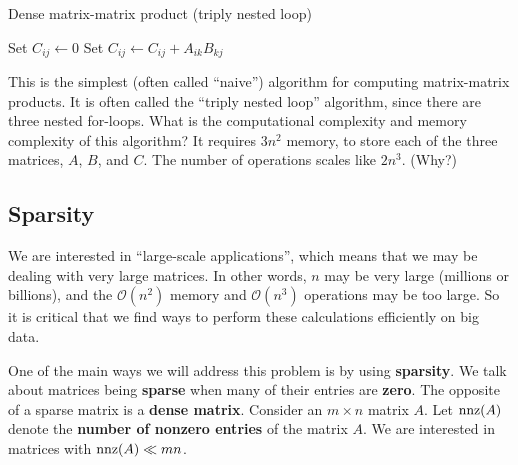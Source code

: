 \documentclass{lecture}
\begin{document}
\begin{algorithm}[H]
   \caption{Dense matrix-matrix product (triply nested loop)}
   \begin{algorithmic}[1]
            \State Set $C_{ij} \gets 0$
               \State Set $C_{ij} \gets C_{ij} + A_{ik} B_{kj}$
            \EndFor
         \EndFor
      \EndFor
   \end{algorithmic}
\end{algorithm}

This is the simplest (often called ``naive'') algorithm for computing matrix-matrix products.
It is often called the ``triply nested loop'' algorithm, since there are three nested for-loops.
What is the computational complexity and memory complexity of this algorithm?
It requires $3 n^2$ memory, to store each of the three matrices, $A$, $B$, and $C$.
The number of operations scales like $2n^3$. (Why?)

\subsection*{Sparsity}

We are interested in ``large-scale applications'', which means that we may be dealing with very large matrices.
In other words, $n$ may be very large (millions or billions), and the $\mathcal{O}(n^2)$ memory and $\mathcal{O}(n^3)$ operations may be too large.
So it is critical that we find ways to perform these calculations efficiently on big data.

One of the main ways we will address this problem is by using \textbf{sparsity}.
We talk about matrices being \textbf{sparse} when many of their entries are \textbf{zero}.
The opposite of a sparse matrix is a \textbf{dense matrix}.
Consider an $m \times n$ matrix $A$.
Let $\operatorname{nnz}(A)$ denote the \textbf{number of nonzero entries} of the matrix $A$.
We are interested in matrices with $\operatorname{nnz}(A) \ll mn$.
\end{document}
